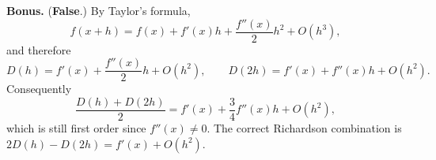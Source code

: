 \documentclass[a4paper]{article}
\begin{document}
\noindent\textbf{Bonus.} (\textbf{False}.)
By Taylor's formula,
\[
    f(x + h) = f(x) + f'(x) h + \frac{f''(x)}{2} h^2 + O(h^3),
\]
and therefore
\[
    D(h) = f'(x) + \frac{f''(x)}{2} h + O(h^2),
    \qquad
    D(2h) = f'(x) + f''(x) h + O(h^2).
\]
Consequently
\[
    \frac{D(h) + D(2h)}{2} = f'(x) + \frac{3}{4} f''(x) h + O(h^2),
\]
which is still first order since $f''(x) \neq 0$.
The correct Richardson combination is $2 D(h) - D(2h) = f'(x) + O(h^2)$.
\fi
\end{document}
